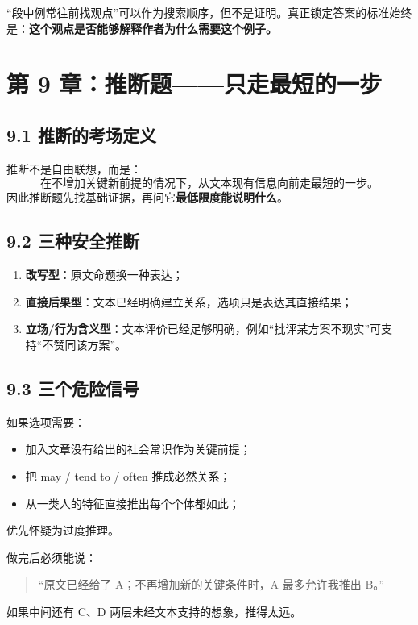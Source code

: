 \documentclass[11pt,a4paper]{ctexart}
\newcommand{\kw}[1]{\textbf{#1}}
\begin{document}
\begin{method}[位置经验怎么使用]
“段中例常往前找观点”可以作为搜索顺序，但不是证明。真正锁定答案的标准始终是：\kw{这个观点是否能够解释作者为什么需要这个例子。}
\end{method}

\section{第 9 章：推断题——只走最短的一步}

\subsection{9.1 推断的考场定义}
推断不是自由联想，而是：
\[
\boxed{\textbf{在不增加关键新前提的情况下，从文本现有信息向前走最短的一步。}}
\]
因此推断题先找基础证据，再问它\kw{最低限度能说明什么}。

\subsection{9.2 三种安全推断}
\begin{enumerate}
  \item \kw{改写型}：原文命题换一种表达；
  \item \kw{直接后果型}：文本已经明确建立关系，选项只是表达其直接结果；
  \item \kw{立场/行为含义型}：文本评价已经足够明确，例如“批评某方案不现实”可支持“不赞同该方案”。
\end{enumerate}

\subsection{9.3 三个危险信号}
如果选项需要：
\begin{itemize}
  \item 加入文章没有给出的社会常识作为关键前提；
  \item 把 may / tend to / often 推成必然关系；
  \item 从一类人的特征直接推出每个个体都如此；
\end{itemize}
优先怀疑为过度推理。

\begin{exam}[推断题收口句]
做完后必须能说：
\begin{quote}
“原文已经给了 A；不再增加新的关键条件时，A 最多允许我推出 B。”
\end{quote}
如果中间还有 C、D 两层未经文本支持的想象，推得太远。
\end{exam}
\end{document}
